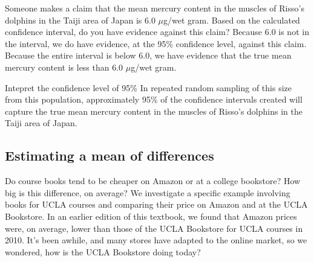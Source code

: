 \begin{examplewrap}
\begin{nexample}
{Someone makes a claim that the mean mercury content in the muscles of Risso's dolphins in the Taiji area of Japan is 6.0 $\mu$g/wet gram.  Based on the calculated confidence interval, do you have evidence against this claim?}
Because 6.0 is not in the interval, we do have evidence, at the 95\% confidence level, against this claim.  Because the entire interval is below 6.0, we have evidence that the true mean mercury content is less than 6.0 $\mu$g/wet gram.
\end{nexample}
\end{examplewrap}

\begin{examplewrap}
\begin{nexample}
{Intepret the confidence level of 95\%}
In repeated random sampling of this size from this population, approximately 95\% of the confidence intervals created will capture the true mean mercury content in the muscles of Risso's dolphins in the Taiji area of Japan.
\end{nexample}
\end{examplewrap}

\subsection{Estimating a mean of differences}
\label{ciMeanOfDifferences}
\label{oneSampleTConfidenceIntervals}

\label{pairedData}




\newcommand{\uclabookN}{68}
\newcommand{\uclabookM}{3.58}
\newcommand{\uclabookSD}{13.42}
\newcommand{\uclabookSE}{1.63}


\noindent%
Do course books tend to be cheaper on Amazon or at a college bookstore?  How big is this difference, on average?  We investigate a specific example involving books for UCLA courses and comparing their price on Amazon and at the UCLA Bookstore.  In an earlier edition of this textbook,
we found that Amazon prices were, on average,
lower than those of the UCLA Bookstore for UCLA courses
in 2010.
It's been awhile, and many stores have adapted
to the online market, so we wondered,
how is the UCLA Bookstore doing today?

